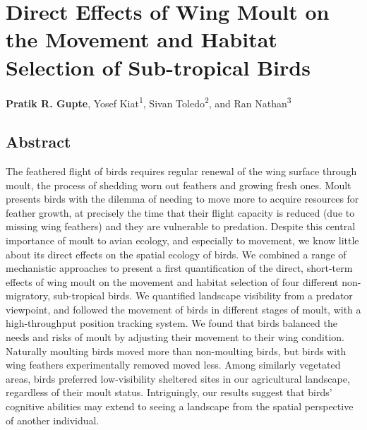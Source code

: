 \chapter{Direct Effects of Wing Moult on the Movement and Habitat Selection of Sub-tropical Birds}\label{ch:holeybirds}

{\noindent \sffamily\textbf{Pratik R. Gupte}, Yosef Kiat\textsuperscript{1}, Sivan Toledo\textsuperscript{2}, and Ran Nathan\textsuperscript{3}}


\section*{Abstract}



\small{
    The feathered flight of birds requires regular renewal of the wing surface through moult, the process of shedding worn out feathers and growing fresh ones.
    Moult presents birds with the dilemma of needing to move more to acquire resources for feather growth, at precisely the time that their flight capacity is reduced (due to missing wing feathers) and they are vulnerable to predation.
    Despite this central importance of moult to avian ecology, and especially to movement, we know little about its direct effects on the spatial ecology of birds.
    We combined a range of mechanistic approaches to present a first quantification of the direct, short-term effects of wing moult on the movement and habitat selection of four different non-migratory, sub-tropical birds.
    We quantified landscape visibility from a predator viewpoint, and followed the movement of birds in different stages of moult, with a high-throughput position tracking system.
    We found that birds balanced the needs and risks of moult by adjusting their movement to their wing condition.
    Naturally moulting birds moved more than non-moulting birds, but birds with wing feathers experimentally removed moved less.
    Among similarly vegetated areas, birds preferred low-visibility sheltered sites in our agricultural landscape, regardless of their moult status.
    Intriguingly, our results suggest that birds' cognitive abilities may extend to seeing a landscape from the spatial perspective of another individual.   
}

\clearpage

